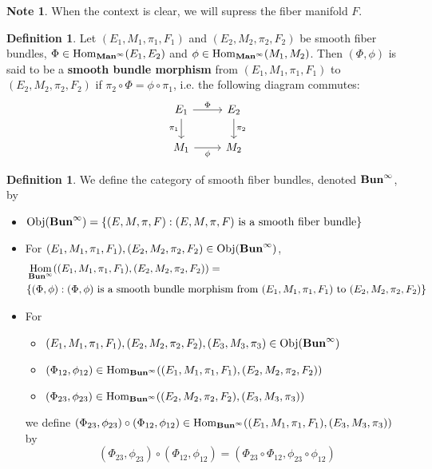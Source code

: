 \documentclass{book}
\theoremstyle{definition}
\newtheorem{defn}[definition]{Definition}
\newtheorem{note}[definition]{Note}
\DeclareMathOperator{\Obj}{Obj}
\DeclareMathOperator{\Hom}{Hom}
\DeclareMathOperator*{\Maninf}{\text{\tbf{Man}}^{\infty}}
\DeclareMathOperator*{\Buninf}{\text{\tbf{Bun}}^{\infty}}
\DeclareMathOperator*{\0}{\mbf{0}}
\DeclareMathOperator*{\1}{\mbf{1}}
\newcommand{\tbf}[1]{\textbf{#1}}
\begin{document}
	\begin{note}
		When the context is clear, we will supress the fiber manifold $F$.
	\end{note}

	\begin{defn}
		Let $(E_1, M_1, \pi_1, F_1)$ and $(E_2, M_2, \pi_2, F_2)$ be smooth fiber bundles, $\Phi \in \Hom_{\Maninf}(E_1, E_2)$ and $\phi \in \Hom_{\Maninf}(M_1, M_2)$. Then $(\Phi, \phi)$ is said to be a \tbf{smooth bundle morphism} from $(E_1, M_1, \pi_1, F_1)$ to $(E_2, M_2, \pi_2, F_2)$ if 
		$\pi_2 \circ \Phi = \phi \circ \pi_1$, 
		i.e. the following diagram commutes:
		\[ 
		\begin{tikzcd}
			E_1 \arrow[r, "\Phi"] \arrow[d, "\pi_1"'] & E_2  \arrow[d, "\pi_2"] \\
			M_1 \arrow[r, "\phi"']                  & M_2
		\end{tikzcd}
		\] 
	\end{defn}
	
	\begin{defn}
		We define the category of smooth fiber bundles, denoted $\Buninf$, by 
		\begin{itemize}
			\item $\Obj(\Buninf) = \{(E, M, \pi, F): (E, M, \pi, F) \text{ is a smooth fiber bundle}\}$ 
			\item For $(E_1, M_1, \pi_1, F_1), (E_2, M_2, \pi_2, F_2) \in \Obj(\Buninf)$, 
			\begin{align*}
				& \Hom_{\Buninf}((E_1, M_1, \pi_1, F_1), (E_2, M_2, \pi_2, F_2)) = \\
				& \{(\Phi, \phi): (\Phi, \phi) \text{ is a smooth bundle morphism from $(E_1, M_1, \pi_1, F_1)$ to $(E_2, M_2, \pi_2, F_2)$} \}
			\end{align*}
			\item For 
			\begin{itemize}
				\item $(E_1, M_1, \pi_1, F_1), (E_2, M_2, \pi_2, F_2), (E_3, M_3, \pi_3) \in \Obj(\Buninf)$ 
				\item $(\Phi_{12}, \phi_{12}) \in \Hom_{\Buninf}((E_1, M_1, \pi_1, F_1), (E_2, M_2, \pi_2, F_2))$
				\item $(\Phi_{23}, \phi_{23}) \in \Hom_{\Buninf}((E_2, M_2, \pi_2, F_2), (E_3, M_3, \pi_3))$ 
			\end{itemize}
			we define $(\Phi_{23}, \phi_{23}) \circ (\Phi_{12}, \phi_{12}) \in \Hom_{\Buninf}((E_1, M_1, \pi_1, F_1), (E_3, M_3, \pi_3))$ by 
			$$(\Phi_{23}, \phi_{23}) \circ (\Phi_{12}, \phi_{12}) = (\Phi_{23} \circ \Phi_{12}, \phi_{23} \circ \phi_{12})$$
		\end{itemize}
	\end{defn}
\end{document}
